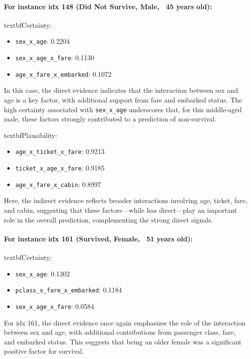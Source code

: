 \documentclass[acmlarge]{acmart}
\begin{document}
\paragraph{For instance idx 148 (Did Not Survive, Male, ~45 years old):} \newline 
textbf{Certainty:}
\begin{itemize}
    \item \texttt{sex\_x\_age}: 0.2204
    \item \texttt{sex\_x\_age\_x\_fare}: 0.1130
    \item \texttt{age\_x\_fare\_x\_embarked}: 0.1072
\end{itemize}
In this case, the direct evidence indicates that the interaction between sex and age is a key factor, with additional support from fare and embarked status. The high certainty associated with \texttt{sex\_x\_age} underscores that, for this middle-aged male, these factors strongly contributed to a prediction of non-survival.

textbf{Plausibility:}
\begin{itemize}
    \item \texttt{age\_x\_ticket\_x\_fare}: 0.9213
    \item \texttt{ticket_x_age_x_fare}: 0.9185
    \item \texttt{age\_x\_fare\_x\_cabin}: 0.8997
\end{itemize}
Here, the indirect evidence reflects broader interactions involving age, ticket, fare, and cabin, suggesting that these factors—while less direct—play an important role in the overall prediction, complementing the strong direct signals.

\paragraph{For instance idx 161 (Survived, Female, ~51 years old):}  
\newline 
textbf{Certainty:}
\begin{itemize}
    \item \texttt{sex\_x\_age}: 0.1302
    \item \texttt{pclass\_x\_fare\_x\_embarked}: 0.1184
    \item \texttt{sex\_x\_age\_x\_fare}: 0.0584
\end{itemize}
For idx 161, the direct evidence once again emphasizes the role of the interaction between sex and age, with additional contributions from passenger class, fare, and embarked status. This suggests that being an older female was a significant positive factor for survival.
\end{document}
